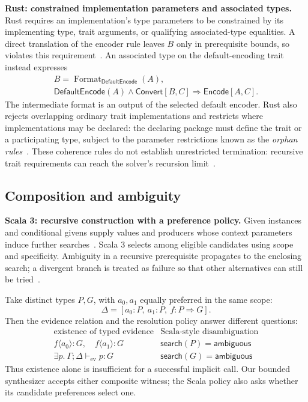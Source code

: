 \documentclass[10pt,a4paper]{article}
\newcommand{\Pj}[2]{\Gamma;\Delta\vdash_{\mathrm{ev}} #1:#2}
\newcommand{\iarg}[1]{\langle#1\rangle}
\newcommand{\kw}[1]{\mathsf{#1}}
\begin{document}
\textbf{Rust: constrained implementation parameters and associated types.}
Rust requires an implementation's type parameters to be constrained by its
implementing type, trait arguments, or qualifying associated-type equalities.
A direct translation of the encoder rule leaves $B$ only in prerequisite bounds,
so violates this requirement~\cite{rust-impl}.
An associated type on the default-encoding trait instead expresses
\[
\begin{gathered}
 B=\operatorname{Format}_{\kw{DefaultEncode}}(A),\\
 \kw{DefaultEncode}(A)\land\kw{Convert}[B,C]\Longrightarrow\kw{Encode}[A,C].
\end{gathered}
\]
The intermediate format is an output of the selected default encoder.
Rust also rejects overlapping ordinary trait implementations and restricts
where implementations may be declared: the declaring package must define the
trait or a participating type, subject to the parameter restrictions known as
the \emph{orphan rules}~\cite{rust-impl}.
These coherence rules do not establish unrestricted termination: recursive trait
requirements can reach the solver's recursion limit~\cite{rust-resolution-limits}.

\subsection{Composition and ambiguity}
\textbf{Scala 3: recursive construction with a preference policy.}
Given instances and conditional givens supply values and producers whose context
parameters induce further searches~\cite{scala-givens}.
Scala 3 selects among eligible candidates using scope and specificity. Ambiguity
in a recursive prerequisite propagates to the enclosing search; a divergent branch
is treated as failure so that other alternatives can still be tried~\cite{scala-resolution}.

Take distinct types $P,G$, with $a_0,a_1$ equally preferred in the same scope:
\[
 \Delta=[a_0:P,\ a_1:P,\ f:P\Rightarrow G].
\]
Then the evidence relation and the resolution policy answer different questions:
\[
\begin{array}{c|c}
 \text{existence of typed evidence} & \text{Scala-style disambiguation}\\ \hline
 f\iarg{a_0}:G,\quad f\iarg{a_1}:G
   & \mathsf{search}(P)=\mathsf{ambiguous}\\
 \exists p.\ \Pj p G
   & \mathsf{search}(G)=\mathsf{ambiguous}
\end{array}
\]
Thus existence alone is insufficient for a successful implicit call.
Our bounded synthesizer accepts either composite witness; the Scala policy also
asks whether its candidate preferences select one.
\end{document}
